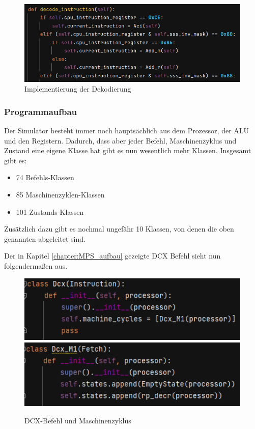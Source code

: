 \documentclass[12pt]{article}
\newcommand{\imgSpaceBefore}{\vspace{10pt}}
\begin{document}
\imgSpaceBefore
\begin{figure}[H]
\centering
\includegraphics[width=15cm]{bilder/DecodeInstruction}
\caption{Implementierung der Dekodierung}
\label{fig:Decode_instr}
\end{figure}

\subsubsection{Programmaufbau}

Der Simulator besteht immer noch hauptsächlich aus dem Prozessor, der ALU und den Registern. Dadurch, dass aber jeder Befehl, Maschinenzyklus und Zustand eine eigene Klasse  hat gibt es nun wesentlich mehr Klassen. Insgesamt gibt es:

\begin{itemize}
\item 74 Befehls-Klassen
\item 85 Maschinenzyklen-Klassen
\item 101 Zustands-Klassen
\end{itemize}

\noindent
Zusätzlich dazu gibt es nochmal ungefähr 10 Klassen, von denen die oben genannten abgeleitet sind.

\noindent
Der in Kapitel \ref{chapter:MPS_aufbau} gezeigte DCX Befehl sieht nun folgendermaßen aus.

\imgSpaceBefore
\begin{figure}[H]
\centering
\includegraphics[width=15cm]{bilder/dcx_inst}
\includegraphics[width=15cm]{bilder/dcx_mc}
\caption{DCX-Befehl und Maschinenzyklus}
\label{fig:Dcx_instr}
\end{figure}
\end{document}

